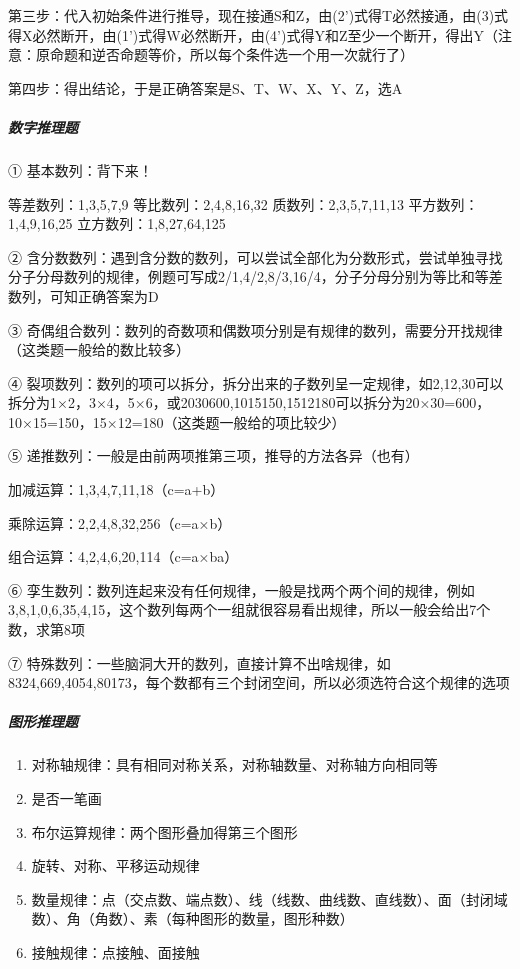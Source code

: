 \documentclass[letterpaper,11pt,english]{sphinxmanual}
\begin{document}
第三步：代入初始条件进行推导，现在接通S和Z，由(2’)式得T必然接通，由(3)式得X必然断开，由(1’)式得W必然断开，由(4’)式得Y和Z至少一个断开，得出\sphinxhyphen{}Y（注意：原命题和逆否命题等价，所以每个条件选一个用一次就行了）

第四步：得出结论，于是正确答案是S、T、\sphinxhyphen{}W、\sphinxhyphen{}X、\sphinxhyphen{}Y、Z，选A


\subparagraph{数字推理题}
\label{\detokenize{chapter_interview/exam:id7}}
① 基本数列：背下来！

等差数列：1,3,5,7,9 等比数列：2,4,8,16,32 质数列：2,3,5,7,11,13
平方数列：1,4,9,16,25 立方数列：1,8,27,64,125

②
含分数数列：遇到含分数的数列，可以尝试全部化为分数形式，尝试单独寻找分子分母数列的规律，例题可写成2/1,4/2,8/3,16/4，分子分母分别为等比和等差数列，可知正确答案为D

③
奇偶组合数列：数列的奇数项和偶数项分别是有规律的数列，需要分开找规律（这类题一般给的数比较多）

④
裂项数列：数列的项可以拆分，拆分出来的子数列呈一定规律，如2,12,30可以拆分为1×2，3×4，5×6，或2030600,1015150,1512180可以拆分为20×30=600，10×15=150，15×12=180（这类题一般给的项比较少）

⑤
递推数列：一般是由前两项推第三项，推导的方法各异（也有）

加减运算：1,3,4,7,11,18（c=a+b）

乘除运算：2,2,4,8,32,256（c=a×b）

组合运算：4,2,4,6,20,114（c=a×b\sphinxhyphen{}a）

⑥
孪生数列：数列连起来没有任何规律，一般是找两个两个间的规律，例如3,8,1,0,6,35,4,15，这个数列每两个一组就很容易看出规律，所以一般会给出7个数，求第8项

⑦
特殊数列：一些脑洞大开的数列，直接计算不出啥规律，如8324,669,4054,80173，每个数都有三个封闭空间，所以必须选符合这个规律的选项


\subparagraph{图形推理题}
\label{\detokenize{chapter_interview/exam:id8}}\begin{enumerate}
%
\item {} 
对称轴规律：具有相同对称关系，对称轴数量、对称轴方向相同等

\item {} 
是否一笔画

\item {} 
布尔运算规律：两个图形叠加得第三个图形

\item {} 
旋转、对称、平移运动规律

\item {} 
数量规律：点（交点数、端点数）、线（线数、曲线数、直线数）、面（封闭域数）、角（角数）、素（每种图形的数量，图形种数）

\item {} 
接触规律：点接触、面接触

\end{enumerate}
\end{document}
